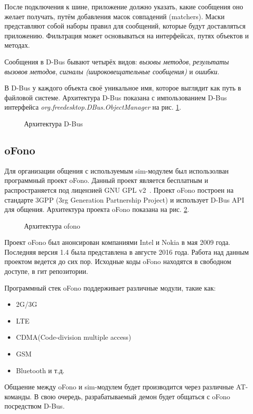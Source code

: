 После подключения к шине, приложение должно указать, какие сообщения оно желает получать, путём добавления масок совпадений (matchers). Маски представляют собой наборы правил для сообщений, которые будут доставляться приложению. Фильтрация может основываться на интерфейсах, путях объектов и методах.

Сообщения в D-Bus бывают четырёх видов: \textit{вызовы методов}, \textit{результаты вызовов методов}, \textit{сигналы (широковещательные сообщения)} и \textit{ошибки}.

В D-Bus у каждого объекта своё уникальное имя, которое выглядит как путь в файловой системе. Архитектура D-Bus показана с импользованием D-Bus интерфейса \textit{org.freedesktop.DBus.ObjectManager} на рис. \ref{fig:dbus}.
\begin{figure}[H]
\caption{Архитектура D-Bus}
\label{fig:dbus}
\end{figure}
\subsection{oFono}
Для организации общения с используемым sim-модулем был использолван программный проект oFono. Данный проект является бесплатным и распространяется под лицензией GNU GPL v2~\cite{oFono}. Проект oFono построен на стандарте 3GPP (3rg Generation Partnership Project) и использует D-Bus API для общения. Архитектура проекта oFono показана на рис. \ref{fig:ofono}.
\begin{figure}[H]
\caption{Архитектура ofono}
\label{fig:ofono}
\end{figure}

Проект oFono был анонсирован компаниями Intel и Nokia в мая 2009 года. Последняя версия 1.4 была представлена в августе 2016 года. Работа над данным проектом ведется до сих пор. Исходные коды oFono находятся в свободном доступе, в гит репозитории.

Программный стек oFono поддерживает различные модули, такие как:
\begin{itemize}
\item 2G/3G
\item LTE
\item CDMA(Code-division multiple access)
\item GSM
\item Bluetooth и т.д.
\end{itemize}

Общаение между oFono и sim-модулем будет производится через различные AT-команды. В свою очередь, разрабатываемый демон будет общаться с oFono посредством D-Bus.
